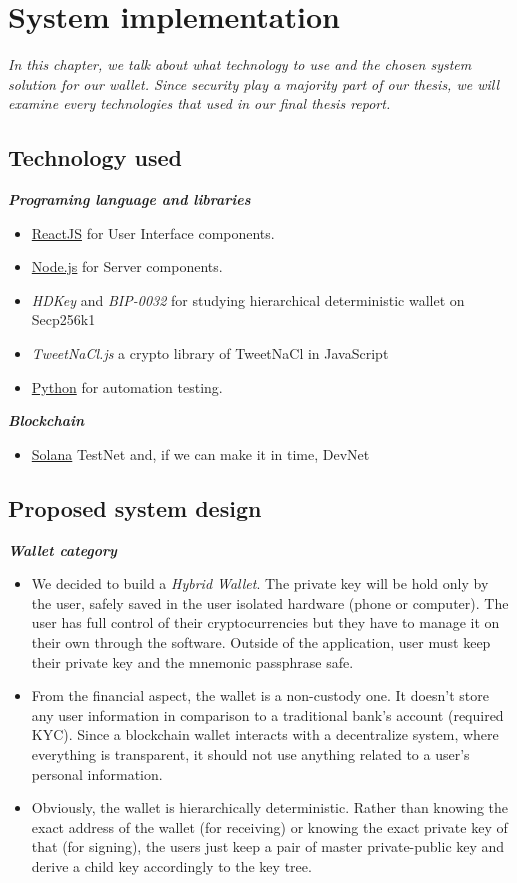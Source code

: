 \chapter{System implementation} \label{chap:System_implementation}
\textit{In this chapter, we talk about what technology to use and the chosen system solution for our wallet. Since security play a majority part of our thesis, we will examine every technologies that used in our final thesis report.}
\minitoc


\section{Technology used}
{\textit {\textbf{Programing language and libraries}}}
\begin{itemize}
\item \href{https://reactjs.org/}{ReactJS} for User Interface components. 
\item \href{https://nodejs.org/en/}{Node.js} for Server components.
\item \emph{HDKey} and \emph{BIP-0032} for studying hierarchical deterministic wallet on Secp256k1
\item \emph{TweetNaCl.js} a crypto library of TweetNaCl in JavaScript
\item \href{https://www.python.org/}{Python} for automation testing.
\end{itemize}

{\textit {\textbf{Blockchain}}}
\begin{itemize}
    \item \href{https://solana.com/}{Solana} TestNet and, if we can make it in time, DevNet
\end{itemize}

\section{Proposed system design}
{\textit {\textbf{Wallet category}}}
\begin{itemize}
    \item We decided to build a \emph{Hybrid Wallet}. The private key will be hold only by the user, safely saved in the user isolated hardware (phone or computer). The user has full control of their cryptocurrencies but they have to manage it on their own through the software. Outside of the application, user must keep their private key and the mnemonic passphrase safe.
    \item From the financial aspect, the wallet is a non-custody one. It doesn't store any user information in comparison to a traditional bank's account (required KYC). Since a blockchain wallet interacts with a decentralize system, where everything is transparent, it should not use anything related to a user's personal information.
    \item Obviously, the wallet is hierarchically deterministic. Rather than knowing the exact address of the wallet (for receiving) or knowing the exact private key of that (for signing), the users just keep a pair of master private-public key and derive a child key accordingly to the key tree.
\end{itemize}

